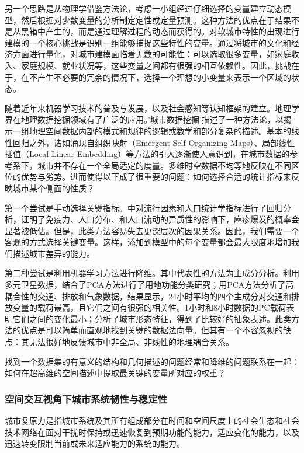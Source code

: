另一个思路是从物理学借鉴方法论，考虑一小组经过仔细选择的变量建立动态模型，然后根据对少数变量的分析制定定性或定量预测。这种方法的优点在于结果不是从黑箱中产生的，而是通过理解过程的动态而获得的。对软城市特性的出现进行建模的一个核心挑战是识别一组能够捕捉这些特性的变量。通过将城市的文化和经济方面进行量化，对城市建模面临着无数的可能性：可以选取很多变量，如家庭收入、家庭规模、就业状况等，这些变量之间都有很强的相互依赖性。因此，挑战在于，在不产生不必要的冗余的情况下，选择一个理想的小变量来表示一个区域的状态。

随着近年来机器学习技术的普及与发展，以及社会感知等认知框架的建立。地理学界在地理数据挖掘领域有了广泛的应用。'城市数据挖掘'描述了一种方法论，以揭示一组地理空间数据内部的模式和规律的逻辑或数学和部分复杂的描述\cite{behnisch2009urban, bendimerad2016unsupervised}。基本的线性回归之外，诸如涌现自组织映射（Emergent Self Organizing Maps）、局部线性插值（Local Linear Embedding）等方法的引入逐渐使人意识到，在城市数据的参考系下，城市并不存在一个全局适定的度量。多维时空数据不均等地反映在不同区位的优势与劣势。进而使得以下成了很重要的问题：如何选择合适的统计指标来反映城市某个侧面的性质？

第一个尝试是手动选择关键指标。\cite{bosetti2020heterogeneity}中对流行因素和人口统计学指标进行了回归分析，证明了免疫力、人口分布、和人口流动的异质性的影响下，麻疹爆发的概率会显著被低估。但是，此类方法容易失去更深层次的因果关系。因此，我们需要一个客观的方式选择关键变量。这样，添加到模型中的每个变量都会最大限度地增加我们描述城市差异的能力。


第二种尝试是利用机器学习方法进行降维。其中代表性的方法为主成分分析。\cite{deng2008pca}利用多元卫星数据，结合了PCA方法进行了用地功能分类研究；\cite{nagendra2003principal}用PCA方法分析了高耦合性的交通、排放和气象数据，结果显示，24小时平均的四个主成分对交通和排放变量的载荷最高，且它们之间有很强的相关性。1小时和8小时数据的PC载荷表明它们之间的变化最小；\cite{palmason2005classification}分析了城市形态特征，得到了比较好的抽象表述。此类方法的优点是可以简单而直观地找到关键的数据法向量。但其有一个不容忽视的缺点：其无法很好地反馈城市中非全局、非线性的地理耦合关系。

找到一个数据集的有意义的结构和几何描述的问题经常和降维的问题联系在一起：如何在超高维的空间描述中提取最关键的变量所对应的权重？


\subsubsection{空间交互视角下城市系统韧性与稳定性}

城市复原力是指城市系统及其所有组成部分在时间和空间尺度上的社会生态和社会技术网络在面对干扰时保持或迅速恢复到预期功能的能力，适应变化的能力，以及迅速转变限制当前或未来适应能力的系统的能力\cite{meerow2016defining}。

